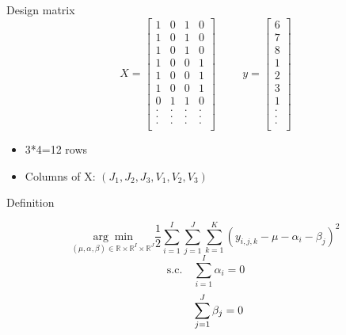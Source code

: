 \documentclass[unknownkeysallowed]{beamer}
\begin{document}
\begin{frame}{Design matrix}
$$X=\left[\begin{array}{llllll}
1 & 0  & 1 & 0 \\
1 & 0  & 1 & 0 \\
1 & 0  & 1 & 0 \\
1 & 0  & 0 & 1 \\
1 & 0  & 0 & 1 \\
1 & 0  & 0 & 1 \\
0 & 1  & 1 & 0 \\
. & . &  . & . \\
. & . &  . & . \\
. & . &  . & . \\
\end{array}\right]\hspace{1cm} y=\left[\begin{array}{l}
6\\
7\\
8\\
1\\
2\\
3\\    %
1\\
.\\
.\\
.\\
\end{array}\right]
$$
\begin{itemize}
    \item 3*4=12 rows
    \item Columns of X: $(J_1,J_2,J_3,V_1,V_2,V_3)$
\end{itemize}
\end{frame}








\begin{frame}{Definition}
\begin{alertblock}{}
$$\underset{(\mu, \alpha, \beta) \in \mathbb{R} \times \mathbb{R}^{I} \times \mathbb{R}^{J}}{\arg \min } \frac{1}{2} \sum_{i=1}^{I} \sum_{j=1}^{J} \sum_{k=1}^{K}\left(y_{i, j, k}-\mu-\alpha_{i}-\beta_{j}\right)^{2}$$
$$\text {s.c.} \quad \sum_{i=1}^{I} \alpha_{i}=0$$
 $$\hspace{0.83cm} \sum_{j=1}^{J} \beta_{j}=0$$
\end{alertblock}
\end{frame}
\end{document}
